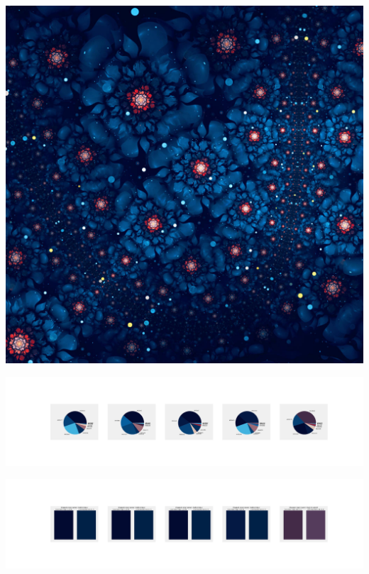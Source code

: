 \documentclass[11pt]{article}
\begin{document}
\begin{landscape}
    \begin{center}
    \includegraphics[width=\textwidth]{./nbimg/file (388).jpg}
    \end{center}

    \begin{center}
    \includegraphics[width=250mm]{./nbimg/pie-320.jpg}
    \end{center}

    \begin{center}
    \includegraphics[width=250mm]{./nbimg/peak-320.jpg}
    \end{center}
    


\end{landscape}
\end{document}
